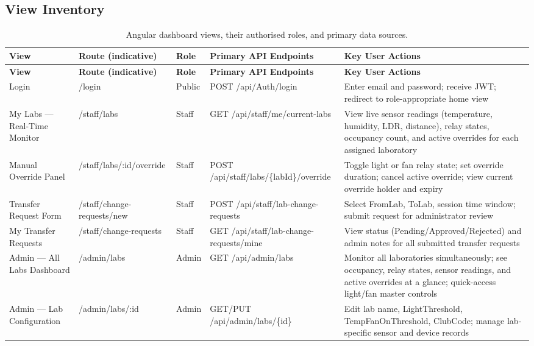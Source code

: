 \subsection{View Inventory}
\begin{longtable}{|L{2.5cm}|L{2.0cm}|L{1.0cm}|L{3.0cm}|L{5.0cm}|}
\caption{Angular dashboard views, their authorised roles, and primary data sources.} \label{tab:4-10} \\
\hline
{}
\textbf{View} & \textbf{Route (indicative)} & \textbf{Role} & \textbf{Primary API Endpoints} & \textbf{Key User Actions} \\
\hline
\endfirsthead
\hline
{}
\textbf{View} & \textbf{Route (indicative)} & \textbf{Role} & \textbf{Primary API Endpoints} & \textbf{Key User Actions} \\
\hline
\endhead
\hline
\endfoot
\hline
\endlastfoot
Login & /login & Public & POST /api/Auth/login & Enter email and password; receive JWT; redirect to role-appropriate home view \\
\hline
My Labs --- Real-Time Monitor & /staff/labs & Staff & GET /api/staff/me/current-labs & View live sensor readings (temperature, humidity, LDR, distance), relay states, occupancy count, and active overrides for each assigned laboratory \\
\hline
Manual Override Panel & /staff/labs/:id/override & Staff & POST /api/staff/labs/\{labId\}/override & Toggle light or fan relay state; set override duration; cancel active override; view current override holder and expiry \\
\hline
Transfer Request Form & /staff/change-requests/new & Staff & POST /api/staff/lab-change-requests & Select FromLab, ToLab, session time window; submit request for administrator review \\
\hline
My Transfer Requests & /staff/change-requests & Staff & GET /api/staff/lab-change-requests/mine & View status (Pending/Approved/Rejected) and admin notes for all submitted transfer requests \\
\hline
Admin --- All Labs Dashboard & /admin/labs & Admin & GET /api/admin/labs & Monitor all laboratories simultaneously; see occupancy, relay states, sensor readings, and active overrides at a glance; quick-access light/fan master controls \\
\hline
Admin --- Lab Configuration & /admin/labs/:id & Admin & GET/PUT /api/admin/labs/\{id\} & Edit lab name, LightThreshold, TempFanOnThreshold, ClubCode; manage lab-specific sensor and device records \\

\end{longtable}
